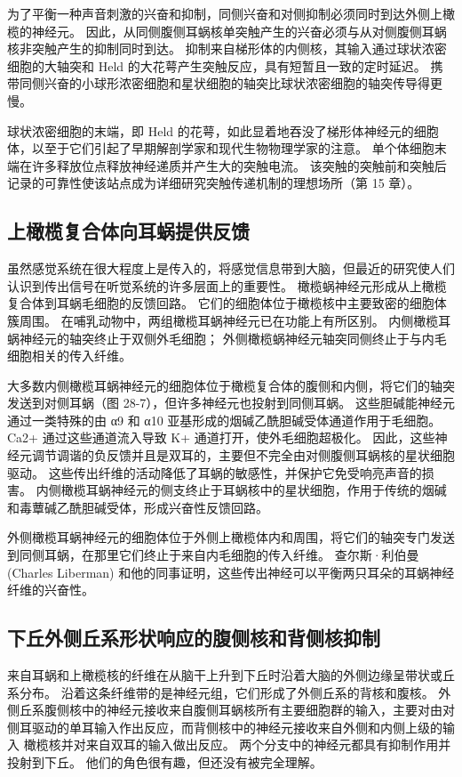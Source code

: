为了平衡一种声音刺激的兴奋和抑制，同侧兴奋和对侧抑制必须同时到达外侧上橄榄的神经元。 因此，从同侧腹侧耳蜗核单突触产生的兴奋必须与从对侧腹侧耳蜗核非突触产生的抑制同时到达。 抑制来自梯形体的内侧核，其输入通过球状浓密细胞的大轴突和 Held 的大花萼产生突触反应，具有短暂且一致的定时延迟。 携带同侧兴奋的小球形浓密细胞和星状细胞的轴突比球状浓密细胞的轴突传导得更慢。

球状浓密细胞的末端，即 Held 的花萼，如此显着地吞没了梯形体神经元的细胞体，以至于它们引起了早期解剖学家和现代生物物理学家的注意。 单个体细胞末端在许多释放位点释放神经递质并产生大的突触电流。 该突触的突触前和突触后记录的可靠性使该站点成为详细研究突触传递机制的理想场所（第 15 章）。


\subsection{上橄榄复合体向耳蜗提供反馈}
虽然感觉系统在很大程度上是传入的，将感觉信息带到大脑，但最近的研究使人们认识到传出信号在听觉系统的许多层面上的重要性。 橄榄蜗神经元形成从上橄榄复合体到耳蜗毛细胞的反馈回路。 它们的细胞体位于橄榄核中主要致密的细胞体簇周围。 在哺乳动物中，两组橄榄耳蜗神经元已在功能上有所区别。 内侧橄榄耳蜗神经元的轴突终止于双侧外毛细胞； 外侧橄榄蜗神经元轴突同侧终止于与内毛细胞相关的传入纤维。

大多数内侧橄榄耳蜗神经元的细胞体位于橄榄复合体的腹侧和内侧，将它们的轴突发送到对侧耳蜗（图 28-7），但许多神经元也投射到同侧耳蜗。 这些胆碱能神经元通过一类特殊的由 α9 和 α10 亚基形成的烟碱乙酰胆碱受体通道作用于毛细胞。 Ca2+ 通过这些通道流入导致 K+ 通道打开，使外毛细胞超极化。 因此，这些神经元调节调谐的负反馈并且是双耳的，主要但不完全由对侧腹侧耳蜗核的星状细胞驱动。 这些传出纤维的活动降低了耳蜗的敏感性，并保护它免受响亮声音的损害。 内侧橄榄耳蜗神经元的侧支终止于耳蜗核中的星状细胞，作用于传统的烟碱和毒蕈碱乙酰胆碱受体，形成兴奋性反馈回路。

外侧橄榄耳蜗神经元的细胞体位于外侧上橄榄体内和周围，将它们的轴突专门发送到同侧耳蜗，在那里它们终止于来自内毛细胞的传入纤维。 查尔斯·利伯曼 (Charles Liberman) 和他的同事证明，这些传出神经可以平衡两只耳朵的耳蜗神经纤维的兴奋性。



\subsection{下丘外侧丘系形状响应的腹侧核和背侧核抑制}
来自耳蜗和上橄榄核的纤维在从脑干上升到下丘时沿着大脑的外侧边缘呈带状或丘系分布。 沿着这条纤维带的是神经元组，它们形成了外侧丘系的背核和腹核。 外侧丘系腹侧核中的神经元接收来自腹侧耳蜗核所有主要细胞群的输入，主要对由对侧耳驱动的单耳输入作出反应，而背侧核中的神经元接收来自外侧和内侧上级的输入 橄榄核并对来自双耳的输入做出反应。 两个分支中的神经元都具有抑制作用并投射到下丘。 他们的角色很有趣，但还没有被完全理解。

